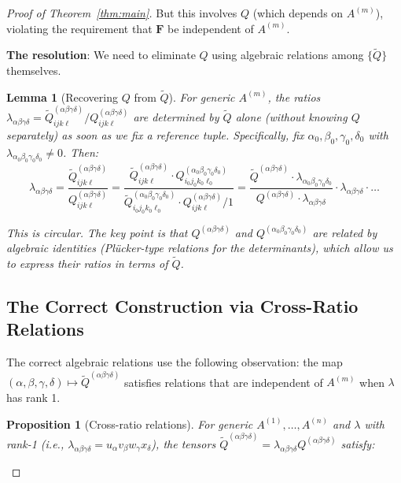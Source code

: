\documentclass[12pt]{article}
\newtheorem{lemma}{Lemma}
\newtheorem{proposition}{Proposition}
\theoremstyle{definition}
\begin{document}
\begin{proof}[Proof of Theorem~\ref{thm:main}]
But this involves $Q$ (which depends on $A^{(m)}$), violating the requirement that $\mathbf{F}$ be independent of $A^{(m)}$.

\textbf{The resolution}: We need to eliminate $Q$ using algebraic relations among $\{\tilde{Q}\}$ themselves.

\begin{lemma}[Recovering $Q$ from $\tilde{Q}$]\label{lem:recover}
For generic $A^{(m)}$, the ratios $\lambda_{\alpha\beta\gamma\delta} = \tilde{Q}^{(\alpha\beta\gamma\delta)}_{ijk\ell}/Q^{(\alpha\beta\gamma\delta)}_{ijk\ell}$ are determined by $\tilde{Q}$ alone (without knowing $Q$ separately) \emph{as soon as we fix a reference tuple}. Specifically, fix $\alpha_0,\beta_0,\gamma_0,\delta_0$ with $\lambda_{\alpha_0\beta_0\gamma_0\delta_0}\neq 0$. Then:
$$\lambda_{\alpha\beta\gamma\delta} = \frac{\tilde{Q}^{(\alpha\beta\gamma\delta)}_{ijk\ell}}{Q^{(\alpha\beta\gamma\delta)}_{ijk\ell}} = \frac{\tilde{Q}^{(\alpha\beta\gamma\delta)}_{ijk\ell}\cdot Q^{(\alpha_0\beta_0\gamma_0\delta_0)}_{i_0j_0k_0\ell_0}}{\tilde{Q}^{(\alpha_0\beta_0\gamma_0\delta_0)}_{i_0j_0k_0\ell_0}\cdot Q^{(\alpha\beta\gamma\delta)}_{ijk\ell}/1} = \frac{\tilde{Q}^{(\alpha\beta\gamma\delta)}\cdot\lambda_{\alpha_0\beta_0\gamma_0\delta_0}}{Q^{(\alpha\beta\gamma\delta)}\cdot\lambda_{\alpha\beta\gamma\delta}}\cdot\lambda_{\alpha\beta\gamma\delta} \cdot\ldots$$

This is circular. The key point is that $Q^{(\alpha\beta\gamma\delta)}$ and $Q^{(\alpha_0\beta_0\gamma_0\delta_0)}$ are related by algebraic identities (Plücker-type relations for the determinants), which allow us to express their ratios in terms of $\tilde{Q}$.
\end{lemma}

\subsection{The Correct Construction via Cross-Ratio Relations}

The correct algebraic relations use the following observation: the map $(\alpha,\beta,\gamma,\delta)\mapsto\tilde{Q}^{(\alpha\beta\gamma\delta)}$ satisfies relations that are independent of $A^{(m)}$ when $\lambda$ has rank 1.

\begin{proposition}[Cross-ratio relations]\label{prop:cross-ratio}
For generic $A^{(1)},\ldots,A^{(n)}$ and $\lambda$ with rank-1 (i.e., $\lambda_{\alpha\beta\gamma\delta} = u_\alpha v_\beta w_\gamma x_\delta$), the tensors $\tilde{Q}^{(\alpha\beta\gamma\delta)} = \lambda_{\alpha\beta\gamma\delta}Q^{(\alpha\beta\gamma\delta)}$ satisfy:


\end{proposition}
\end{proof}
\end{document}
